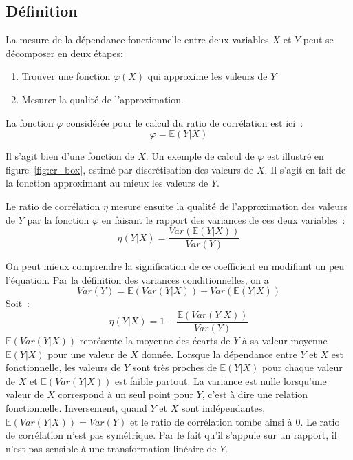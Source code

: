 \documentclass[../main]{subfiles}
\begin{document}
\subsection{Définition}

La mesure de la dépendance fonctionnelle entre deux variables $X$ et $Y$ peut se décomposer en deux étapes:
\begin{enumerate}
    \item Trouver une fonction $\varphi(X)$ qui approxime les valeurs de $Y$
    \item Mesurer la qualité de l'approximation.
\end{enumerate}

La fonction $\varphi$ considérée pour le calcul du ratio de corrélation est ici~:
\begin{equation}
    \varphi = \mathbb{E}(Y|X)
\end{equation}

Il s'agit bien d'une fonction de $X$. Un exemple de calcul de $\varphi$ est illustré en figure~\ref{fig:cr_box}, estimé par discrétisation des valeurs de $X$. Il s'agit en fait de la fonction approximant au mieux les valeurs de $Y$.

Le ratio de corrélation $\eta$ mesure ensuite la qualité de l'approximation des valeurs de $Y$ par la fonction $\varphi$ en faisant le rapport des variances de ces deux variables~:
\begin{equation}
    \eta(Y|X) = \frac{Var(\mathbb{E}(Y|X))}{Var(Y)}
\end{equation}

On peut mieux comprendre la signification de ce coefficient en modifiant un peu l'équation.
Par la définition des variances conditionnelles, on a 
$$Var(Y) = \mathbb{E}(Var(Y|X)) + Var(\mathbb{E}(Y|X))$$
Soit~:
$$\eta(Y|X) = 1 - \frac{\mathbb{E}(Var(Y|X))}{Var(Y)}$$
$\mathbb{E}(Var(Y|X))$ représente la moyenne des écarts de $Y$ à sa valeur moyenne $\mathbb{E}(Y|X)$ pour une valeur de $X$ donnée. Lorsque la dépendance entre $Y$ et $X$ est fonctionnelle, les valeurs de $Y$ sont très proches de $\mathbb{E}(Y|X)$ pour chaque valeur de $X$ et $\mathbb{E}(Var(Y|X))$ est faible partout. La variance est nulle lorsqu'une valeur de $X$ correspond à un seul point pour $Y$, c'est à dire une relation fonctionnelle. Inversement, quand $Y$ et $X$ sont indépendantes, $\mathbb{E}(Var(Y|X)) = Var(Y)$ et le ratio de corrélation tombe ainsi à 0.
Le ratio de corrélation n'est pas symétrique. Par le fait qu'il s'appuie sur un rapport, il n'est pas sensible à une transformation linéaire de $Y$.
\end{document}
